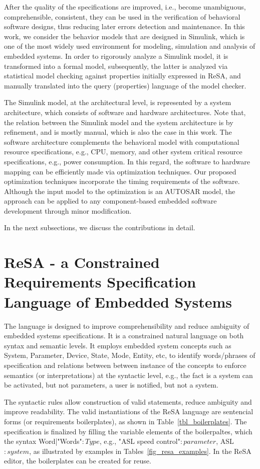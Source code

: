 After the quality of the specifications are improved, i.e., become unambiguous,  comprehensible, consistent, they can be used in the verification of behavioral software designs, thus reducing later errors detection and maintenance. In this work, we consider the behavior models that are designed in Simulink, which is one of the most widely used environment for modeling, simulation and analysis of embedded systems. In order to rigorously analyze a Simulink model, it is transformed into a formal model, subsequently, the latter is analyzed via statistical model checking against properties initially expressed in ReSA, and manually translated into the query (properties) language of the model checker.

The Simulink model, at the architectural level, is represented by a system architecture, which consists of software and hardware architectures. Note that, the relation between the Simulink model and the system architecture is by refinement, and is mostly manual, which is also the case in this work. The software architecture complements the behavioral model with computational resource specifications, e.g., CPU, memory, and other system critical resource specifications, e.g., power consumption. In this regard, the software to hardware mapping can be efficiently made via optimization techniques. Our proposed optimization techniques incorporate the timing requirements of the software. Although the input model to the optimization is an AUTOSAR model, the approach can be applied to any component-based embedded software development through minor modification. 

In the next subsections, we discuss the contributions in detail.
\section{ReSA - a Constrained Requirements Specification Language of Embedded Systems}\label{rc_resa}
The language is designed to improve comprehensibility and reduce ambiguity of embedded systems specifications. It is a constrained natural language on both syntax and semantic levels. It employs embedded system concepts such as System, Parameter, Device, State, Mode, Entity, etc, to identify words/phrases of specification and relations between between instance of the concepts to enforce semantics (or interpretations) at the syntactic level, e.g., the fact is a system can be activated, but not parameters, a user is notified, but not a system. 

The syntactic rules allow construction of valid statements, reduce ambiguity and improve readability. The valid instantiations of the ReSA language are sentencial forms (or requirements boilerplates), as shown in Table~\ref{tbl_boilerplates}. The specification is finalized by filling the variable elements of the boilerpaltes, which the syntax {\small Word|"Words"}$:Type$, e.g., "ASL speed control"$:parameter$, ASL$:system$, as illustrated by examples in Tables~\ref{fig_resa_examples}. In the ReSA editor, the boilerplates can be created for reuse.
